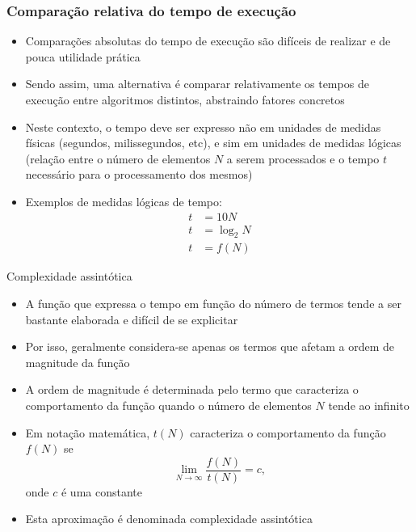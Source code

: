 \begin{frame}[fragile]\frametitle{Comparação relativa do tempo de execução}

	\begin{itemize}
        \item Comparações absolutas do tempo de execução são difíceis de realizar e de pouca
            utilidade prática

        \item Sendo assim, uma alternativa é comparar relativamente os tempos de execução entre
            algoritmos distintos, abstraindo fatores concretos
            
		\item Neste contexto, o tempo deve ser expresso não em unidades de medidas físicas 
        (segundos, milissegundos, etc), e sim em unidades de medidas lógicas (relação entre o 
        número de elementos $N$ a serem 
        processados e o tempo $t$ necessário para o processamento dos mesmos)
		
		\item Exemplos de medidas lógicas de tempo:
        \begin{align*}
        t &= 10N \\
        t &= \log_2 N \\
        t &= f(N)
        \end{align*}
    
	\end{itemize}

\end{frame}

\begin{frame}[fragile]{Complexidade assintótica}

	\begin{itemize}
		\item A função que expressa o tempo em função do número de 
		termos tende a ser bastante elaborada e difícil de se explicitar

        \item Por isso, geralmente considera-se apenas os termos que afetam a 
		ordem de magnitude da função

		\item A ordem de magnitude é determinada pelo termo que caracteriza o comportamento da 
        função quando o número de elementos $N$ tende ao infinito

        \item Em notação matemática, $t(N)$ caracteriza o comportamento da função $f(N)$ se
        \[
            \lim_{N\to \infty} \frac{f(N)}{t(N)} = c,
        \]
        onde $c$ é uma constante

		\item Esta aproximação é denominada complexidade assintótica
	\end{itemize}

\end{frame}

